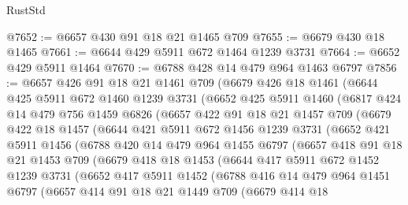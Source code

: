 \begin{lexlean}{RustStd}
\begin{coremodule}
@7652 := @6657 @430 @91 @18 @21 @1465 @709
@7655 := @6679 @430 @18 @1465
@7661 := @6644 @429 @5911 @672 @1464 @1239 @3731
@7664 := @6652 @429 @5911 @1464
@7670 := @6788 @428 @14 @479 @964 @1463 @6797
@7856 := @6657
    @426
    @91
    @18
    @21
    @1461
    @709
    (@6679
      @426
      @18
      @1461
      (@6644
        @425
        @5911
        @672
        @1460
        @1239
        @3731
        (@6652
          @425
          @5911
          @1460
          (@6817
            @424
            @14
            @479
            @756
            @1459
            @6826
            (@6657
              @422
              @91
              @18
              @21
              @1457
              @709
              (@6679
                @422
                @18
                @1457
                (@6644
                  @421
                  @5911
                  @672
                  @1456
                  @1239
                  @3731
                  (@6652
                    @421
                    @5911
                    @1456
                    (@6788
                      @420
                      @14
                      @479
                      @964
                      @1455
                      @6797
                      (@6657
                        @418
                        @91
                        @18
                        @21
                        @1453
                        @709
                        (@6679
                          @418
                          @18
                          @1453
                          (@6644
                            @417
                            @5911
                            @672
                            @1452
                            @1239
                            @3731
                            (@6652
                              @417
                              @5911
                              @1452
                              (@6788
                                @416
                                @14
                                @479
                                @964
                                @1451
                                @6797
                                (@6657
                                  @414
                                  @91
                                  @18
                                  @21
                                  @1449
                                  @709
                                  (@6679
                                    @414
                                    @18

\end{coremodule}
\end{lexlean}
